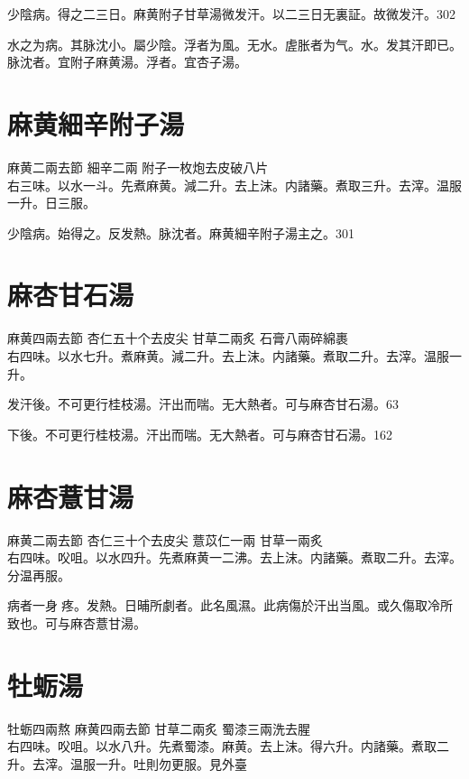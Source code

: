 少陰病。得之二三日。麻黄附子甘草湯微发汗。以二三日无{\khaai 裏}証。故微发汗。302

水之为病。其脉沈小。屬少陰。浮者为風。无水。虗胀者为气。水。发其汗即已。脉沈者。宜附子麻黄湯。浮者。宜杏子湯。

\section{麻黄細辛附子湯}

麻黄{\scriptsize 二兩去節} 細辛{\scriptsize 二兩} 附子{\scriptsize 一枚炮去皮破八片}\\
右三味。以水一斗。先煮麻黄。減二升。去上沫。内諸藥。煮取三升。去滓。温服一升。日三服。

少陰病。始得之。反发熱。脉沈者。麻黄細辛附子湯主之。301

\section{麻杏甘石湯}

麻黄{\scriptsize 四兩去節} 杏仁{\scriptsize 五十个去皮尖} 甘草{\scriptsize 二兩炙} 石膏{\scriptsize 八兩碎綿裹}\\
右四味。以水七升。煮麻黄。減二升。去上沫。内諸藥。煮取二升。去滓。温服一升。

发汗後。不可更行桂枝湯。汗出而喘。无大熱者。可与麻杏甘石湯。63

下後。不可更行桂枝湯。汗出而喘。无大熱者。可与麻杏甘石湯。162

\section{麻杏薏甘湯}

麻黄{\scriptsize 二兩去節} 杏仁{\scriptsize 三十个去皮尖} 薏苡仁{\scriptsize 一兩} 甘草{\scriptsize 一兩炙}\\
右四味。㕮咀。以水四升。先煮麻黄一二沸。去上沫。内諸藥。煮取二升。去滓。分温再服。{\wuben}

病者一身{\sungii 𥁞}疼。发熱。日晡所劇者。此名風濕。此病傷於汗出当風。或久傷取冷所致也。可与麻杏薏甘湯。

\section{牡蛎湯}

牡蛎{\scriptsize 四兩熬} 麻黄{\scriptsize 四兩去節} 甘草{\scriptsize 二兩炙} 蜀漆{\scriptsize 三兩洗去腥}\\
右四味。㕮咀。以水八升。先煮蜀漆。麻黄。去上沫。得六升。内諸藥。煮取二升。去滓。温服一升。吐則勿更服。{\scriptsize 見外臺}

